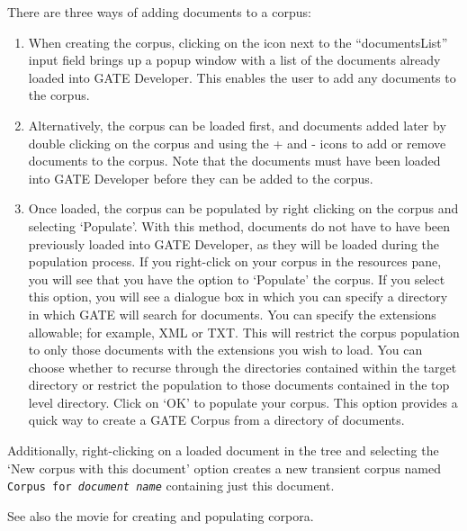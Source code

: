 There are three ways of adding documents to a corpus:
\begin{enumerate}
  
\item When creating the corpus, clicking on the icon next to the
``documentsList'' input field brings up a popup window with a list of the 
documents already loaded into GATE Developer. This enables the user to add any
documents to the corpus.

\item Alternatively, the corpus can be loaded first, and documents added later
by double clicking on the corpus and using the + and - icons to add or remove
documents to the corpus. Note that the documents must have been loaded
into GATE Developer before they can be added to the corpus.

\item Once loaded, the corpus can be populated by right clicking on the corpus
and selecting `Populate'. With this method, documents do not have to have been
previously loaded into GATE Developer, as they will be loaded during the
population process. If you right-click on your corpus in the resources pane, you
will see that you have the option to `Populate' the corpus. If you select this
option, you will see a dialogue box in which you can specify a directory in which
GATE will search for documents. You can specify the extensions allowable; for
example, XML or TXT. This will restrict the corpus population to only those
documents with the extensions you wish to load. You can choose whether to recurse
through the directories contained within the target directory or restrict the
population to those documents contained in the top level directory. Click on `OK'
to populate your corpus. This option provides a quick way to create a GATE Corpus
from a directory of documents.

\end{enumerate}

Additionally, right-clicking on a loaded document in the tree and selecting
the `New corpus with this document' option creates a new transient corpus
named {\tt Corpus for {\em document name}} containing just this document.

See also the 
{movie for creating and populating corpora}.


